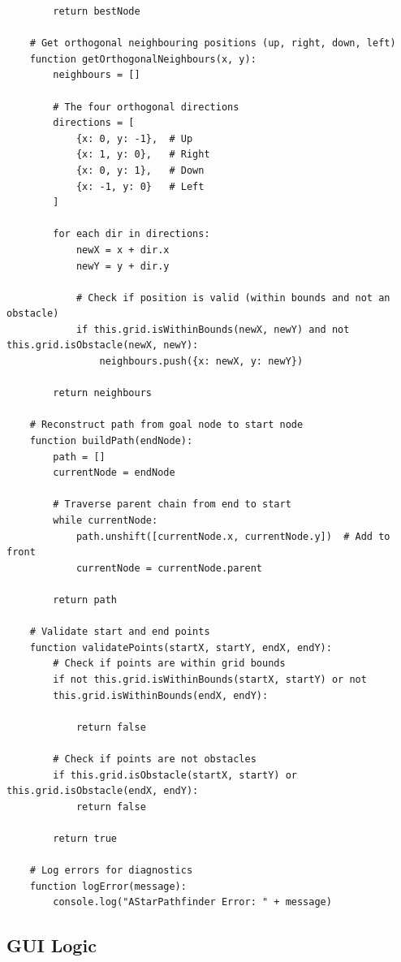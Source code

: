\begin{verbatim}
        return bestNode
    
    # Get orthogonal neighbouring positions (up, right, down, left)
    function getOrthogonalNeighbours(x, y):
        neighbours = []
        
        # The four orthogonal directions
        directions = [
            {x: 0, y: -1},  # Up
            {x: 1, y: 0},   # Right
            {x: 0, y: 1},   # Down
            {x: -1, y: 0}   # Left
        ]
        
        for each dir in directions:
            newX = x + dir.x
            newY = y + dir.y
            
            # Check if position is valid (within bounds and not an obstacle)
            if this.grid.isWithinBounds(newX, newY) and not this.grid.isObstacle(newX, newY):
                neighbours.push({x: newX, y: newY})
        
        return neighbours
    
    # Reconstruct path from goal node to start node
    function buildPath(endNode):
        path = []
        currentNode = endNode
        
        # Traverse parent chain from end to start
        while currentNode:
            path.unshift([currentNode.x, currentNode.y])  # Add to front
            currentNode = currentNode.parent
        
        return path
    
    # Validate start and end points
    function validatePoints(startX, startY, endX, endY):
        # Check if points are within grid bounds
        if not this.grid.isWithinBounds(startX, startY) or not
        this.grid.isWithinBounds(endX, endY):
        
            return false
        
        # Check if points are not obstacles
        if this.grid.isObstacle(startX, startY) or this.grid.isObstacle(endX, endY):
            return false
        
        return true
    
    # Log errors for diagnostics
    function logError(message):
        console.log("AStarPathfinder Error: " + message)
\end{verbatim}

\newpage

\subsection{GUI Logic}

